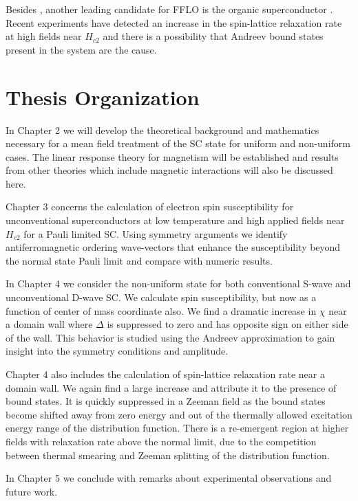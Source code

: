Besides \cecoin , another leading candidate for FFLO is the organic superconductor \kbtf. Recent experiments have detected an increase in the spin-lattice relaxation rate \relt at high fields near $H_{c2}$ and there is a possibility that Andreev bound states present in the system are the cause.

\section{\label{sec:1.3}Thesis Organization}

In Chapter 2 we will develop the theoretical background and mathematics necessary for a mean field treatment of the SC state for uniform and non-uniform cases. The linear response theory for magnetism will be established and results from other theories which include magnetic interactions will also be discussed here.

Chapter 3 concerns the calculation of electron spin susceptibility for unconventional superconductors at low temperature and high applied fields near $H_{c2}$ for a Pauli limited SC. Using symmetry arguments we identify antiferromagnetic ordering wave-vectors that enhance the susceptibility beyond the normal state Pauli limit and compare with numeric results.

In Chapter 4 we consider the non-uniform state for both conventional S-wave and unconventional D-wave SC. We calculate spin susceptibility, but now as a function of center of mass coordinate also. We find a dramatic increase in $\chi$ near a domain wall where $\Delta$ is suppressed to zero and has opposite sign on either side of the wall. This behavior is studied using the Andreev approximation to gain insight into the symmetry conditions and amplitude. 

Chapter 4 also includes the calculation of spin-lattice relaxation rate near a domain wall. We again find a large increase and attribute it to the presence of bound states. It is quickly suppressed in a Zeeman field as the bound states become shifted away from zero energy and out of the thermally allowed excitation energy range of the distribution function. There is a re-emergent region at higher fields with relaxation rate above the normal limit, due to the competition between thermal smearing and Zeeman splitting of the distribution function.

In Chapter 5 we conclude with remarks about experimental observations and future work.